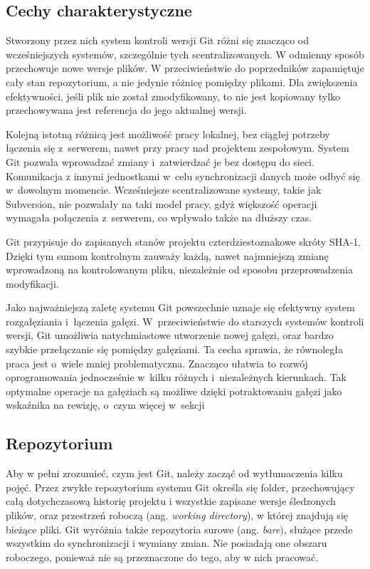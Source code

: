 \documentclass[11pt,a4paper,polish,thesis]{dcsbook}
\begin{document}
	\subsection{Cechy charakterystyczne}
	Stworzony przez nich system kontroli wersji Git różni się znacząco od wcześniejszych systemów, szczególnie tych scentralizowanych. W odmienny sposób przechowuje nowe wersje plików. W przeciwieństwie do poprzedników zapamiętuje cały stan repozytorium, a nie jedynie różnicę pomiędzy plikami. Dla zwiększenia efektywności, jeśli plik nie został zmodyfikowany, to nie jest kopiowany tylko przechowywana jest referencja do jego aktualnej wersji.

	Kolejną istotną różnicą jest możliwość pracy lokalnej, bez ciągłej potrzeby łączenia się z~serwerem, nawet przy pracy nad projektem zespołowym. System Git pozwala wprowadzać zmiany i~zatwierdzać je bez dostępu do sieci. Komunikacja z innymi jednostkami w~celu synchronizacji danych może odbyć się w~dowolnym momencie. Wcześniejsze scentralizowane systemy, takie jak Subversion, nie pozwalały na taki model pracy, gdyż większość operacji wymagała połączenia z~serwerem, co wpływało także na dłuższy czas.

	Git przypisuje do zapisanych stanów projektu czterdziestoznakowe skróty SHA-1. Dzięki tym sumom kontrolnym zauważy każdą, nawet najmniejszą zmianę wprowadzoną na kontrolowanym pliku, niezależnie od sposobu przeprowadzenia modyfikacji.

	Jako najważniejszą zaletę systemu Git powszechnie uznaje się efektywny system rozgałęziania i~łączenia gałęzi. W~przeciwieństwie do starszych systemów kontroli wersji, Git umożliwia natychmiastowe utworzenie nowej gałęzi, oraz bardzo szybkie przełączanie się pomiędzy gałęziami. Ta cecha sprawia, że równoległa praca jest o~wiele mniej problematyczna. Znacząco ułatwia to rozwój oprogramowania jednocześnie w~kilku różnych i~niezależnych kierunkach. Tak optymalne operacje na gałęziach są możliwe dzięki potraktowaniu gałęzi jako wskaźnika na rewizję, o~czym więcej w~sekcji %

	\subsection{Repozytorium}

	Aby w pełni zrozumieć, czym jest Git, należy zacząć od wytłumaczenia kilku pojęć. Przez zwykłe repozytorium systemu Git określa się folder, przechowujący całą dotychczasową historię projektu i wszystkie zapisane wersje śledzonych plików, oraz przestrzeń roboczą (ang. \textit{working directory}), w której znajdują się bieżące pliki. Git wyróżnia także repozytoria surowe (ang. \textit{bare}), służące przede wszystkim do synchronizacji i wymiany zmian. Nie posiadają one obszaru roboczego, ponieważ nie są przeznaczone do tego, aby w nich pracować.
\end{document}
